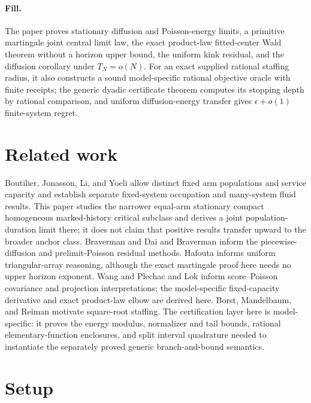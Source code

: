 \documentclass{article}
\begin{document}
\paragraph{Fill.} The paper proves stationary diffusion and Poisson-energy limits, a primitive martingale joint central limit law, the exact product-law fitted-center Wald theorem without a horizon upper bound, the uniform kink residual, and the diffusion corollary under \(T_N=o(N)\). For an exact supplied rational staffing radius, it also constructs a sound model-specific rational objective oracle with finite receipts; the generic dyadic certificate theorem computes its stopping depth by rational comparison, and uniform diffusion-energy transfer gives \(\epsilon+o(1)\) finite-system regret.

\section{Related work}

Boutilier, Jonasson, Li, and Yoeli allow distinct fixed arm populations and service capacity and establish separate fixed-system occupation and many-system fluid results. This paper studies the narrower equal-arm stationary compact homogeneous marked-history critical subclass and derives a joint population-duration limit there; it does not claim that positive results transfer upward to the broader anchor class. Braverman and Dai and Braverman inform the piecewise-diffusion and prelimit-Poisson residual methods. Hafouta informs uniform triangular-array reasoning, although the exact martingale proof here needs no upper horizon exponent. Wang and Plechac and Lok inform score--Poisson covariance and projection interpretations; the model-specific fixed-capacity derivative and exact product-law elbow are derived here. Borst, Mandelbaum, and Reiman motivate square-root staffing. The certification layer here is model-specific: it proves the energy modulus, normalizer and tail bounds, rational elementary-function enclosures, and split interval quadrature needed to instantiate the separately proved generic branch-and-bound semantics.

\section{Setup}
\end{document}
